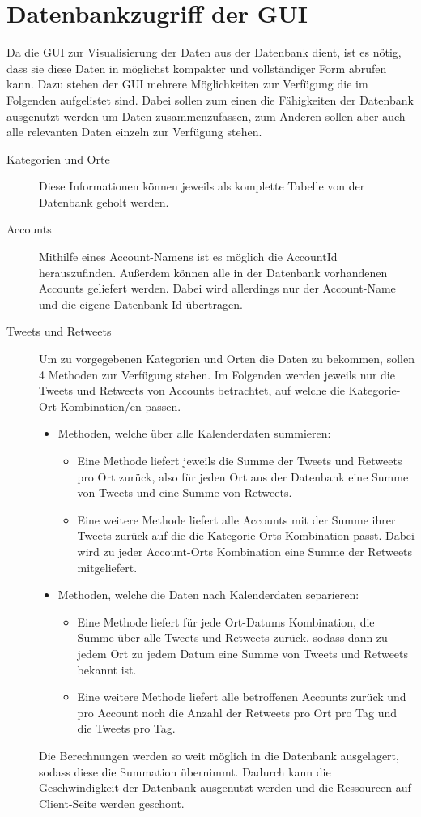 \section{Datenbankzugriff der GUI}
Da die GUI zur Visualisierung der Daten aus der Datenbank dient, ist es nötig, dass sie diese Daten in möglichst kompakter und vollständiger Form abrufen kann. Dazu stehen der GUI mehrere Möglichkeiten zur Verfügung die im Folgenden aufgelistet sind. Dabei sollen zum einen die Fähigkeiten der Datenbank ausgenutzt werden um Daten zusammenzufassen, zum Anderen sollen aber auch alle relevanten Daten einzeln zur Verfügung stehen.\\

\begin{description}
\item[Kategorien und Orte] Diese Informationen können jeweils als komplette Tabelle von der Datenbank geholt werden.
\item[Accounts] Mithilfe eines Account-Namens ist es möglich die AccountId herauszufinden. Außerdem können alle in der Datenbank vorhandenen Accounts geliefert werden. Dabei wird allerdings nur der Account-Name und die eigene Datenbank-Id übertragen.
\item[Tweets und Retweets] Um zu vorgegebenen Kategorien und Orten die Daten zu bekommen, sollen 4 Methoden zur Verfügung stehen. Im Folgenden werden jeweils nur die Tweets und Retweets von Accounts betrachtet, auf welche die Kategorie-Ort-Kombination/en passen.

\begin{itemize}
	\item Methoden, welche über alle Kalenderdaten summieren:
	\begin{itemize}
		\item Eine Methode liefert jeweils die Summe der Tweets und Retweets pro Ort zurück, also für jeden Ort aus der Datenbank eine Summe von Tweets und eine Summe von Retweets.
		\item Eine weitere Methode liefert alle Accounts mit der Summe ihrer Tweets zurück auf die die Kategorie-Orts-Kombination passt. Dabei wird zu jeder Account-Orts Kombination eine Summe der Retweets mitgeliefert.
	\end{itemize}
	\item Methoden, welche die Daten nach Kalenderdaten separieren:
	\begin{itemize}
		\item Eine Methode liefert für jede Ort-Datums Kombination, die Summe über alle Tweets und Retweets zurück, sodass dann zu jedem Ort zu jedem Datum eine Summe von Tweets und Retweets bekannt ist.
		\item Eine weitere Methode liefert alle betroffenen Accounts zurück und pro Account noch die Anzahl der Retweets pro Ort pro Tag und die Tweets pro Tag.
	\end{itemize}
\end{itemize}
Die Berechnungen werden so weit möglich in die Datenbank ausgelagert, sodass diese die Summation übernimmt. Dadurch kann die Geschwindigkeit der Datenbank ausgenutzt werden und die Ressourcen auf Client-Seite werden geschont.


\end{description}